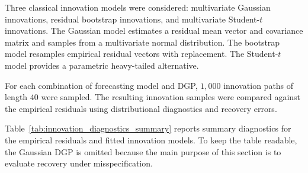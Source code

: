 \documentclass[11pt]{article}
\begin{document}
Three classical innovation models were considered: multivariate Gaussian innovations, residual bootstrap innovations, and multivariate Student-\(t\) innovations. The Gaussian model estimates a residual mean vector and covariance matrix and samples from a multivariate normal distribution. The bootstrap model resamples empirical residual vectors with replacement. The Student-\(t\) model provides a parametric heavy-tailed alternative.

For each combination of forecasting model and DGP, \(1{,}000\) innovation paths of length \(40\) were sampled. The resulting innovation samples were compared against the empirical residuals using distributional diagnostics and recovery errors.

Table~\ref{tab:innovation_diagnostics_summary} reports summary diagnostics for the empirical residuals and fitted innovation models. To keep the table readable, the Gaussian DGP is omitted because the main purpose of this section is to evaluate recovery under misspecification.
\end{document}
